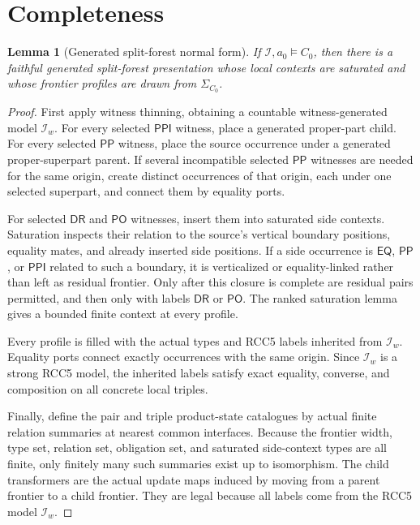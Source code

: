 \documentclass[11pt]{article}
\newtheorem{lemma}[theorem]{Lemma}
\newcommand{\EQ}{\mathsf{EQ}}
\newcommand{\PP}{\mathsf{PP}}
\newcommand{\PPI}{\mathsf{PPI}}
\newcommand{\PO}{\mathsf{PO}}
\newcommand{\DR}{\mathsf{DR}}
\begin{document}
\section{Completeness}

\begin{lemma}[Generated split-forest normal form]
If $\mathcal I,a_0\models C_0$, then there is a faithful generated split-forest presentation whose local contexts are saturated and whose frontier profiles are drawn from $\Sigma_{C_0}$.
\end{lemma}

\begin{proof}
First apply witness thinning, obtaining a countable witness-generated model $\mathcal I_w$.  For every selected $\PPI$ witness, place a generated proper-part child.  For every selected $\PP$ witness, place the source occurrence under a generated proper-superpart parent.  If several incompatible selected $\PP$ witnesses are needed for the same origin, create distinct occurrences of that origin, each under one selected superpart, and connect them by equality ports.

For selected $\DR$ and $\PO$ witnesses, insert them into saturated side contexts.  Saturation inspects their relation to the source's vertical boundary positions, equality mates, and already inserted side positions.  If a side occurrence is $\EQ$, $\PP$, or $\PPI$ related to such a boundary, it is verticalized or equality-linked rather than left as residual frontier.  Only after this closure is complete are residual pairs permitted, and then only with labels $\DR$ or $\PO$.  The ranked saturation lemma gives a bounded finite context at every profile.

Every profile is filled with the actual types and RCC5 labels inherited from $\mathcal I_w$.  Equality ports connect exactly occurrences with the same origin.  Since $\mathcal I_w$ is a strong RCC5 model, the inherited labels satisfy exact equality, converse, and composition on all concrete local triples.

Finally, define the pair and triple product-state catalogues by actual finite relation summaries at nearest common interfaces.  Because the frontier width, type set, relation set, obligation set, and saturated side-context types are all finite, only finitely many such summaries exist up to isomorphism.  The child transformers are the actual update maps induced by moving from a parent frontier to a child frontier.  They are legal because all labels come from the RCC5 model $\mathcal I_w$.
\end{proof}
\end{document}
